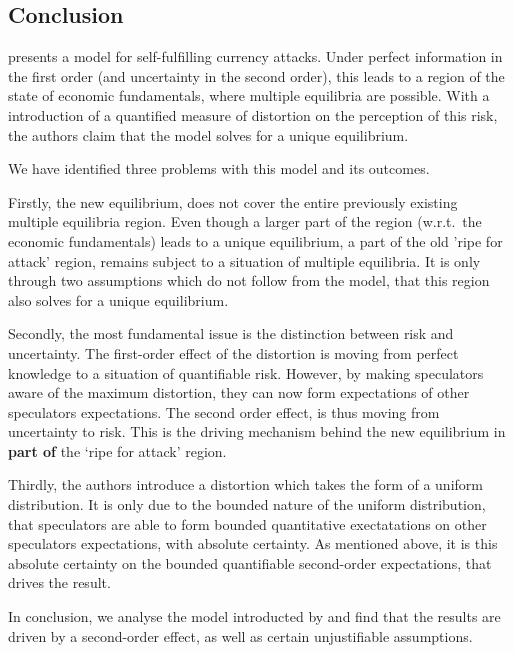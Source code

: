 \begin{refsection}
\section{Conclusion}
\textcite{morris1998unique} presents a model for self-fulfilling currency attacks.
Under perfect information in the first order (and uncertainty in the second order),
this leads to a region of the state of economic fundamentals, where multiple equilibria are possible.
With a introduction of a quantified measure of distortion on the perception of this risk,
the authors claim that the model solves for a unique equilibrium.

We have identified three problems with this model and its outcomes.

Firstly, the new equilibrium, does not cover the entire previously existing multiple equilibria region.
Even though a larger part of the region (w.r.t.~the economic fundamentals) leads to a unique equilibrium,
a part of the old 'ripe for attack' region, remains subject to a situation of multiple equilibria.
It is only through two assumptions which do not follow from the model,
that this region also solves for a unique equilibrium.

Secondly, the most fundamental issue is the distinction between risk and uncertainty.
The first-order effect of the distortion is moving from perfect knowledge to a situation of quantifiable risk.
However, by making speculators aware of the maximum distortion,
they can now form expectations of other speculators expectations.
The second order effect, is thus moving from uncertainty to risk.
This is the driving mechanism behind the new equilibrium in \textbf{part of} the `ripe for attack' region.

Thirdly, the authors introduce a distortion which takes the form of a uniform distribution.
It is only due to the bounded nature of the uniform distribution,
that speculators are able to form bounded quantitative exectatations on other speculators expectations, with absolute certainty.
As mentioned above, it is this absolute certainty on the bounded quantifiable second-order expectations,
that drives the result.

In conclusion, we analyse the model introducted by \textcite{morris1998unique} and find that the results are driven by a second-order effect, as well as certain unjustifiable assumptions.

\nocite{taleb2010black}
\printbibliography
\end{refsection}